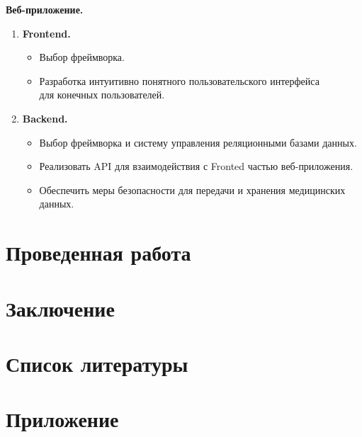 \documentclass[12pt, russian]{extarticle}
\begin{document}
\begin{spacing}{1.5}
\noindent \textbf{Веб-приложение.}

\begin{enumerate}

    \item \textbf{Frontend.}
    \begin{itemize}
        \item Выбор фреймворка.
        \item Разработка интуитивно понятного пользовательского интерфейса \\
            для конечных пользователей.
    \end{itemize}

    \item \textbf{Backend.}
    \begin{itemize}
        \item Выбор фреймворка и систему управления реляционными базами данных.
        \item Реализовать API для взаимодействия с Fronted частью веб-приложения.
        \item Обеспечить меры безопасности для передачи и хранения медицинских данных.
    \end{itemize}

\end{enumerate}

\newpage
\section{Проведенная работа}

\newpage
\section{Заключение}

\newpage
\section{Список литературы}

\newpage
\section{Приложение}

\end{spacing}
\end{document}
